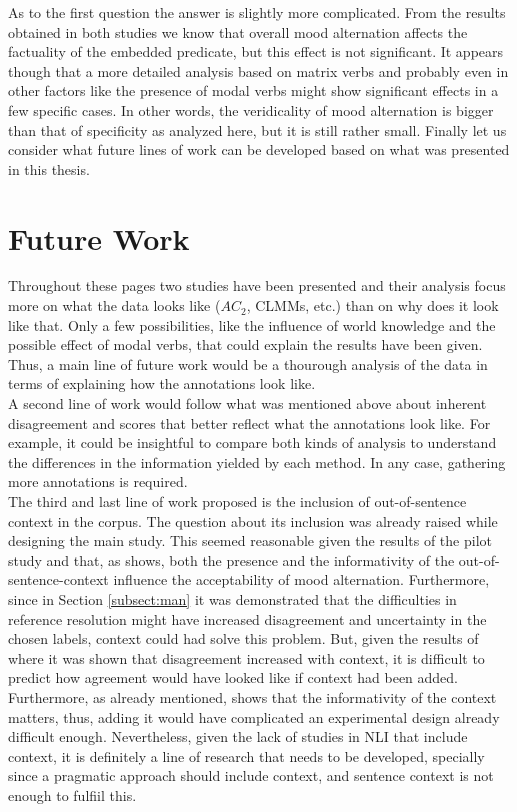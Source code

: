 As to the first question the answer is slightly more complicated. From the results obtained in both studies we know that overall mood alternation affects the factuality of the embedded predicate, but this effect is not significant. It appears though that a more detailed analysis based on matrix verbs and probably even in other factors like the presence of modal verbs might show significant effects in a few specific cases. In other words, the veridicality of mood alternation is bigger than that of specificity as analyzed here, but it is still rather small. Finally let us consider what future lines of work can be developed based on what was presented in this thesis.\\

\section{Future Work}
Throughout these pages two studies have been presented and their analysis focus more on what the data looks like ($AC_2$, CLMMs, etc.) than on why does it look like that. Only a few possibilities, like the influence of world knowledge and the possible effect of modal verbs, that could explain the results have been given. Thus, a main line of future work would be a thourough analysis of the data in terms of explaining how the annotations look like.\\

A second line of work would follow what was mentioned above about inherent disagreement and scores that better reflect what the annotations look like. For example, it could be insightful to compare both kinds of analysis to understand the differences in the information yielded by each method. In any case, gathering more annotations is required.\\

The third and last line of work proposed is the inclusion of out-of-sentence context in the corpus. The question about its inclusion was already raised while designing the main study. This seemed reasonable given the results of the pilot study and that, as \citet{faulkner2021systematic} shows, both the presence and the informativity of the out-of-sentence-context influence the acceptability of mood alternation. Furthermore, since in Section \ref{subsect:man} it was demonstrated that the difficulties in reference resolution might have increased disagreement and uncertainty in the chosen labels, context could had solve this problem. But, given the results of \citet{pavlick2019inherent} where it was shown that disagreement increased with context, it is difficult to predict how agreement would have looked like if context had been added. Furthermore, as already mentioned, \citet{faulkner2021systematic} shows that the informativity of the context matters, thus, adding it would have complicated an experimental design already difficult enough. Nevertheless, given the lack of studies in NLI that include context, it is definitely a line of research that needs to be developed, specially since a pragmatic approach should include context, and sentence context is not enough to fulfiil this.\\